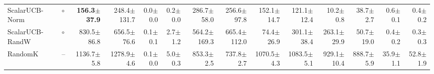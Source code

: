 \begin{tabular}{llrrrrrrrrrrrr}
ScalarUCB-Norm & $\circ$ & \textbf{156.3{\scriptsize$\pm$37.9}} & 248.4{\scriptsize$\pm$131.7} & 0.0{\scriptsize$\pm$0.0} & 0.2{\scriptsize$\pm$0.0} & 286.7{\scriptsize$\pm$58.0} & 256.6{\scriptsize$\pm$97.8} & 152.1{\scriptsize$\pm$14.7} & 121.1{\scriptsize$\pm$12.4} & 10.2{\scriptsize$\pm$0.8} & 38.7{\scriptsize$\pm$2.7} & 0.6{\scriptsize$\pm$0.1} & 0.4{\scriptsize$\pm$0.2}\\
ScalarUCB-RandW & $\circ$ & 830.5{\scriptsize$\pm$86.8} & 656.5{\scriptsize$\pm$76.6} & 0.1{\scriptsize$\pm$0.1} & 2.7{\scriptsize$\pm$1.2} & 564.2{\scriptsize$\pm$169.3} & 665.4{\scriptsize$\pm$112.0} & 74.4{\scriptsize$\pm$26.9} & 301.1{\scriptsize$\pm$38.4} & 263.1{\scriptsize$\pm$29.9} & 50.7{\scriptsize$\pm$19.0} & 0.4{\scriptsize$\pm$0.2} & 0.3{\scriptsize$\pm$0.3}\\
RandomK & -- & 1136.7{\scriptsize$\pm$5.8} & 1278.9{\scriptsize$\pm$4.6} & 0.1{\scriptsize$\pm$0.0} & 5.0{\scriptsize$\pm$0.3} & 853.3{\scriptsize$\pm$2.5} & 737.8{\scriptsize$\pm$2.7} & 1070.5{\scriptsize$\pm$4.3} & 1083.5{\scriptsize$\pm$5.1} & 929.1{\scriptsize$\pm$10.4} & 888.7{\scriptsize$\pm$5.9} & 35.9{\scriptsize$\pm$1.1} & 52.8{\scriptsize$\pm$1.9}\\
\bottomrule
\end{tabular}
